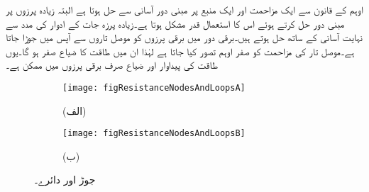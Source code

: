 اوہم کے قانون سے ایک مزاحمت اور ایک منبع پر مبنی دور آسانی سے حل ہوتا ہے البتہ زیادہ  پرزوں پر مبنی دور حل کرتے ہوئے اس کا استعمال قدر مشکل ہوتا ہے۔زیادہ پرزہ جات کے ادوار  کی مدد سے نہایت آسانی کے ساتھ حل ہوتے ہیں۔برقی دور میں برقی پرزوں کو موصل تاروں سے آپس میں جوڑا جاتا ہے۔موصل تار کی مزاحمت کو صفر اوہم تصور کیا جاتا ہے لہٰذا ان میں طاقت کا ضیاع صفر ہو گا۔یوں طاقت کی  پیداوار اور ضیاع صرف برقی پرزوں میں ممکن ہے۔

\begin{figure}
\centering
\begin{subfigure}{0.5\textwidth}
\centering
\texttt{[image: figResistanceNodesAndLoopsA]}
\caption*{(الف)}
\end{subfigure}%
%
\begin{subfigure}{0.5\textwidth}
\centering
\texttt{[image: figResistanceNodesAndLoopsB]}
\caption*{(ب)}%
\end{subfigure}
\caption{جوڑ اور دائرے۔}
\label{شکل_مزاحمتی_جوڑ_دائرہ}
\end{figure}
